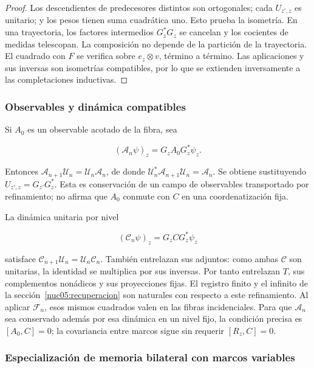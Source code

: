 \begin{proof}
Los descendientes de predecesores distintos son ortogonales; cada \(U_{z',z}\) es unitario; y los pesos tienen suma cuadrática uno. Esto prueba la isometría. En una trayectoria, los factores intermedios \(G_z^*G_z\) se cancelan y los cocientes de medidas telescopan. La composición no depende de la partición de la trayectoria. El cuadrado con \(F\) se verifica sobre \(e_z\otimes v\), término a término. Las aplicaciones y sus inversas son isometrías compatibles, por lo que se extienden inversamente a las completaciones inductivas.
\end{proof}

\subsubsection{Observables y dinámica compatibles}

Si \(A_0\) es un observable acotado de la fibra, sea

\[
(\mathscr A_n\psi)_z=G_zA_0G_z^*\psi_z.
\]

Entonces \(\mathscr A_{n+1}\mathscr U_n=\mathscr U_n\mathscr A_n\), de donde \(\mathscr U_n^*\mathscr A_{n+1}\mathscr U_n=\mathscr A_n\). Se obtiene sustituyendo \(U_{z',z}=G_{z'}G_z^*\). Esta es conservación de un campo de observables transportado por refinamiento; no afirma que \(A_0\) conmute con \(C\) en una coordenatización fija.

La dinámica unitaria por nivel

\[
(\mathscr C_n\psi)_z=G_zCG_z^*\psi_z
\]

satisface \(\mathscr C_{n+1}\mathscr U_n=\mathscr U_n\mathscr C_n\). También entrelazan sus adjuntos: como ambas \(\mathscr C\) son unitarias, la identidad se multiplica por sus inversas. Por tanto entrelazan \(T\), sus complementos nonádicos y sus proyecciones fijas. El registro finito y el infinito de la sección~\ref{nuc05:recuperacion} son naturales con respecto a este refinamiento. Al aplicar \(\mathscr F_n\), esos mismos cuadrados valen en las fibras incidenciales. Para que \(\mathscr A_n\) sea conservado además por esa dinámica en un nivel fijo, la condición precisa es \([A_0,C]=0\); la covariancia entre marcos sigue sin requerir \([R_z,C]=0\).

\subsubsection{Especialización de memoria bilateral con marcos variables}

